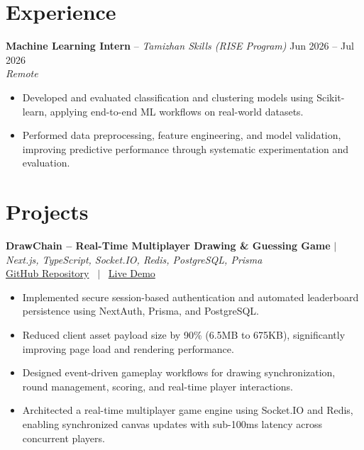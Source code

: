 \documentclass[10pt, a4paper]{article}
\begin{document}

\section{Experience}

\textbf{Machine Learning Intern} -- \textit{Tamizhan Skills (RISE Program)} \hfill Jun 2026 -- Jul 2026 \\
\textit{\small{Remote}} \\
\begin{itemize}

    \item Developed and evaluated classification and clustering models using Scikit-learn, applying end-to-end ML workflows on real-world datasets.

    \item Performed data preprocessing, feature engineering, and model validation, improving predictive performance through systematic experimentation and evaluation.

\end{itemize}
\vspace{2pt}



\section{Projects}

\textbf{DrawChain -- Real-Time Multiplayer Drawing \& Guessing Game} $|$ \textit{Next.js, TypeScript, Socket.IO, Redis, PostgreSQL, Prisma} \\

\small{
\href{https://github.com}{GitHub Repository}
 \ $|$ \ \href{https://demo.example.com}{Live Demo}
} \\

\begin{itemize}

    \item Implemented secure session-based authentication and automated leaderboard persistence using NextAuth, Prisma, and PostgreSQL.

    \item Reduced client asset payload size by 90\% (6.5MB to 675KB), significantly improving page load and rendering performance.

    \item Designed event-driven gameplay workflows for drawing synchronization, round management, scoring, and real-time player interactions.

    \item Architected a real-time multiplayer game engine using Socket.IO and Redis, enabling synchronized canvas updates with sub-100ms latency across concurrent players.

\end{itemize}
\vspace{2pt}
\end{document}
